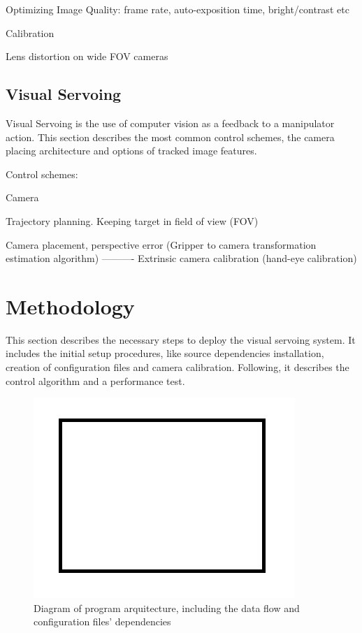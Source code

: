 \documentclass[11pt]{article}
\begin{document}
        
        
        
        Optimizing Image Quality: frame rate, auto-exposition time, bright/contrast etc
        
        Calibration
        
        Lens distortion on wide FOV cameras
    
    \subsection{Visual Servoing}
        Visual Servoing is the use of computer vision as a feedback to a manipulator action. This section describes the most common control schemes, the camera placing architecture and options of tracked image features.
        
        Control schemes: 
        
        Camera 
    
        Trajectory planning. Keeping target in field of view (FOV)
        
        Camera placement, perspective error (Gripper to camera transformation estimation algorithm) ---------- Extrinsic camera calibration (hand-eye calibration)


\section{Methodology}
    This section describes the necessary steps to deploy the visual servoing system. It includes the initial setup procedures, like source dependencies installation, creation of configuration files and camera calibration. Following, it describes the control algorithm and a performance test. 
    
    \begin{figure}[h]
    \centering
    \includegraphics[width=0.35\linewidth]{img/sample}
    \caption{Diagram of program arquitecture, including the data flow and configuration files' dependencies}
    \label{fig:setup}
    \end{figure}
    
\end{document}
